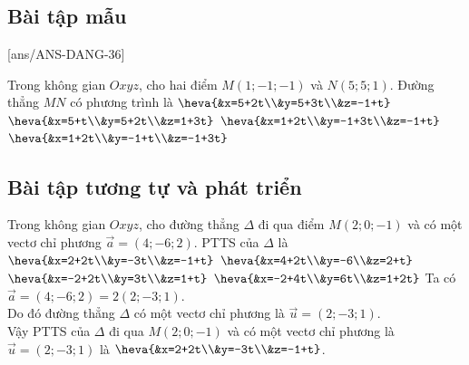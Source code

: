 \subsection{Bài tập mẫu}
[ans/ANS-DANG-36]
\begin{khung}
	\begin{vd}%
Trong không gian $Oxyz$, cho hai điểm $M(1;-1;-1)$ và $N(5;5;1)$. Đường thẳng $MN$ có phương trình là
		\choice
		{$\heva{&x=5+2t\\&y=5+3t\\&z=-1+t}$}	
		{$\heva{&x=5+t\\&y=5+2t\\&z=1+3t}$}
		{\True $\heva{&x=1+2t\\&y=-1+3t\\&z=-1+t}$}	
		{$\heva{&x=1+2t\\&y=-1+t\\&z=-1+3t}$}
	\end{vd}
\end{khung}
\subsection{Bài tập tương tự và phát triển}
\begin{ex}%
	Trong không gian $O x y z$, cho đường thẳng $\Delta$ đi qua điểm $M(2;0;-1)$ và có một vectơ chỉ phương $\vec{a}=(4;-6;2)$. PTTS của $\Delta$ là 
	\choice 
	{\True $\heva{&x=2+2t\\&y=-3t\\&z=-1+t}$}
	{$\heva{&x=4+2t\\&y=-6\\&z=2+t}$}
	{$\heva{&x=-2+2t\\&y=3t\\&z=1+t}$}
	{$\heva{&x=-2+4t\\&y=6t\\&z=1+2t}$}
					\loigiai 
					{
Ta có $\vec{a}=(4;-6;2)=2(2;-3;1)$.\\
Do đó đường thẳng $\Delta$ có một vectơ chỉ phương là $\vec{u}=(2;-3;1)$.\\
Vậy PTTS của $\Delta$ đi qua $M(2;0;-1)$ và có một vectơ chỉ phương là $\vec{u}=(2;-3;1)$ là $\heva{&x=2+2t\\&y=-3t\\&z=-1+t}$.\\
					}
\end{ex}

